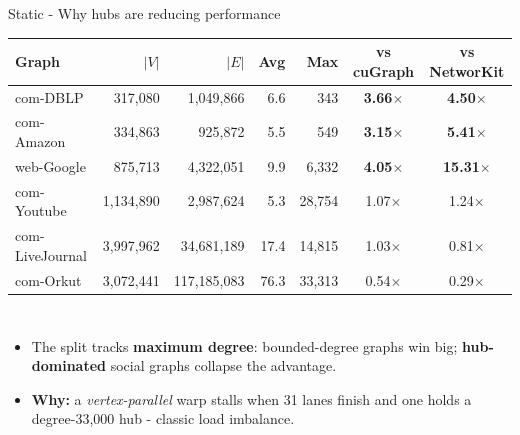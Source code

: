 \documentclass[aspectratio=169]{beamer}
\newcommand{\win}[1]{\textcolor{green!50!black}{\textbf{#1}}}
\newcommand{\loss}[1]{\textcolor{red!70!black}{#1}}
\begin{document}
\begin{frame}{Static - Why hubs are reducing performance}
    \footnotesize
    \begin{center}
    \begin{tabular}{lrrrrcc}
        \toprule
        \textbf{Graph} & $|V|$ & $|E|$ & \textbf{Avg} & \textbf{Max} &
        \textbf{vs cuGraph} & \textbf{vs NetworKit} \\
        \midrule
        com-DBLP        & 317{,}080  & 1{,}049{,}866   & 6.6  & 343    & \win{3.66$\times$} & \win{4.50$\times$} \\
        com-Amazon      & 334{,}863  & 925{,}872       & 5.5  & 549    & \win{3.15$\times$} & \win{5.41$\times$} \\
        web-Google      & 875{,}713  & 4{,}322{,}051   & 9.9  & 6{,}332 & \win{4.05$\times$} & \win{15.31$\times$} \\
        \midrule
        com-Youtube     & 1{,}134{,}890 & 2{,}987{,}624 & 5.3 & 28{,}754 & 1.07$\times$ & 1.24$\times$ \\
        com-LiveJournal & 3{,}997{,}962 & 34{,}681{,}189 & 17.4 & 14{,}815 & 1.03$\times$ & \loss{0.81$\times$} \\
        com-Orkut       & 3{,}072{,}441 & 117{,}185{,}083 & 76.3 & 33{,}313 & \loss{0.54$\times$} & \loss{0.29$\times$} \\
        \bottomrule
    \end{tabular}
    \end{center}
    \begin{columns}
        \begin{itemize}\small
            \item The split tracks \textbf{maximum degree}: bounded-degree graphs win big;
            \textbf{hub-dominated} social graphs collapse the advantage.
            \item \textbf{Why:} a \emph{vertex-parallel} warp stalls when 31 lanes finish and
            one holds a degree-33{,}000 hub - classic load imbalance.
        \end{itemize}
    \end{columns}
\end{frame}
\end{document}
